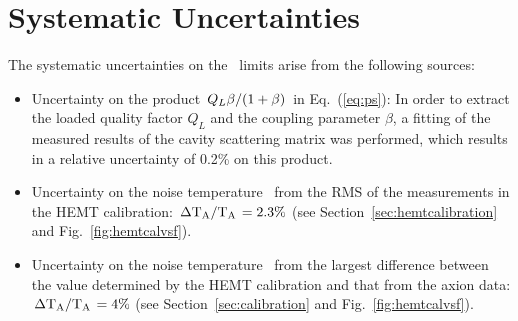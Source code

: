 \section{Systematic Uncertainties}
The systematic uncertainties on the \gagg\ limits arise from the 
following sources:
\begin{itemize}
\item Uncertainty on the product 
$\left.Q_L\beta\middle/\left(1+\beta\right)\right.$ in Eq.~(\ref{eq:ps}): 
In order to extract the loaded quality factor $Q_L$ and the coupling parameter 
$\beta$, a fitting of the measured results of the cavity scattering matrix 
was performed, which results in a relative uncertainty of 0.2\% on this 
product. 

\item Uncertainty on the noise temperature \ta\ from the RMS of 
the measurements in the HEMT calibration: 
$\left. \Delta \text{T}_\text{A}\middle/\text{T}_\text{A}\right.= 2.3\%$ 
(see Section~\ref{sec:hemtcalibration} and Fig.~\ref{fig:hemtcalvsf}).

\item Uncertainty on the noise temperature \ta\ from the largest difference 
between the value determined by the HEMT calibration and that from the axion 
data: $\left. \Delta \text{T}_\text{A}\middle/\text{T}_\text{A}\right.= 4\%$ 
(see Section~\ref{sec:calibration} and Fig.~\ref{fig:hemtcalvsf}). 


\end{itemize}
